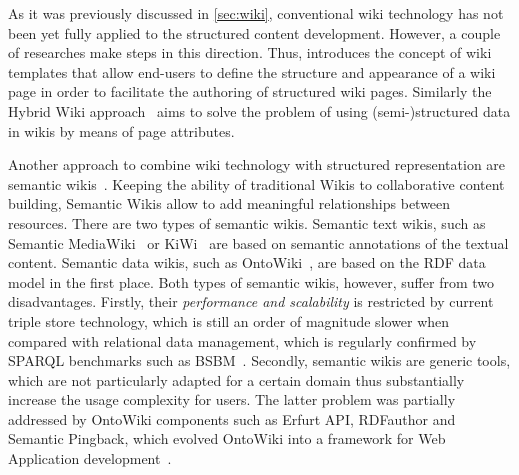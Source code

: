 \documentclass[ngerman,UKenglish,table]{scrbook}
\begin{document}
As it was previously discussed in \autoref{sec:wiki}, conventional wiki technology has not been yet fully applied to the structured content development.
However, a couple of researches make steps in this direction.
Thus, \cite{DBLP:conf/wikis/HaakeLS05} introduces the concept of wiki templates that allow end-users to define the structure and appearance of a wiki page in order to facilitate the authoring of structured wiki pages.
Similarly the Hybrid Wiki approach~\cite{DBLP:conf/icsoft/MatthesNS11} aims to solve the problem of using (semi-)structured data in wikis by means of page attributes.

Another approach to combine wiki technology with structured representation are semantic wikis~\cite{DBLP:journals/software/SchaffertBBK08}.
Keeping the ability of traditional Wikis to collaborative content building, Semantic Wikis allow to add meaningful relationships between resources.
There are two types of semantic wikis.
Semantic text wikis, such as Semantic MediaWiki~\cite{smw:jws07} or KiWi~\cite{DBLP:conf/semwiki/SchaffertEGKRSS09} are based on semantic annotations of the textual content.
Semantic data wikis, such as OntoWiki~\cite{heino-n-2009-61-a}, are based on the RDF data model in the first place.
Both types of semantic wikis, however, suffer from two disadvantages.
Firstly, their \textit{performance and scalability} is restricted by current triple store technology, which is still an order of magnitude slower when compared with relational data management, which is regularly confirmed by SPARQL benchmarks such as BSBM~\cite{DBLP:journals/ijswis/BizerS09}.
Secondly, semantic wikis are generic tools, which are not particularly adapted for a certain domain thus substantially increase the usage complexity for users.
The latter problem was partially addressed by OntoWiki components such as Erfurt API, RDFauthor and Semantic Pingback, which evolved OntoWiki into a framework for Web Application development~\cite{heino-n-2009-61-a}.
\end{document}
